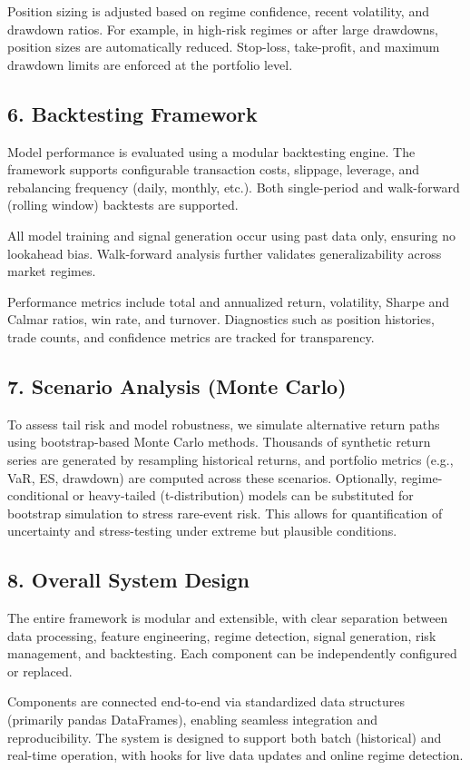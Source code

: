 Position sizing is adjusted based on regime confidence, recent volatility, and drawdown ratios. For example, in high-risk regimes or after large drawdowns, position sizes are automatically reduced. Stop-loss, take-profit, and maximum drawdown limits are enforced at the portfolio level.

\subsection{6. Backtesting Framework}
Model performance is evaluated using a modular backtesting engine. The framework supports configurable transaction costs, slippage, leverage, and rebalancing frequency (daily, monthly, etc.). Both single-period and walk-forward (rolling window) backtests are supported.

All model training and signal generation occur using past data only, ensuring no lookahead bias. Walk-forward analysis further validates generalizability across market regimes.

Performance metrics include total and annualized return, volatility, Sharpe and Calmar ratios, win rate, and turnover. Diagnostics such as position histories, trade counts, and confidence metrics are tracked for transparency.

\subsection{7. Scenario Analysis (Monte Carlo)}
To assess tail risk and model robustness, we simulate alternative return paths using bootstrap-based Monte Carlo methods. Thousands of synthetic return series are generated by resampling historical returns, and portfolio metrics (e.g., VaR, ES, drawdown) are computed across these scenarios. Optionally, regime-conditional or heavy-tailed (t-distribution) models can be substituted for bootstrap simulation to stress rare-event risk. This allows for quantification of uncertainty and stress-testing under extreme but plausible conditions.

\subsection{8. Overall System Design}
The entire framework is modular and extensible, with clear separation between data processing, feature engineering, regime detection, signal generation, risk management, and backtesting. Each component can be independently configured or replaced.

Components are connected end-to-end via standardized data structures (primarily pandas DataFrames), enabling seamless integration and reproducibility. The system is designed to support both batch (historical) and real-time operation, with hooks for live data updates and online regime detection.

